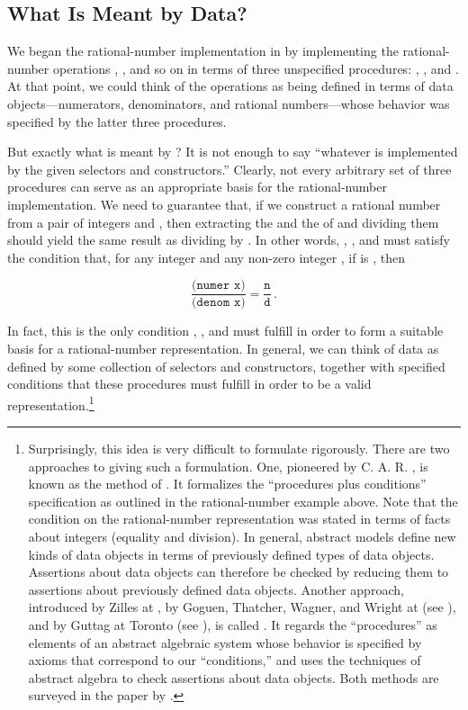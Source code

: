 \subsection{What Is Meant by Data?}
\label{Section 2.1.3}

We began the rational-number implementation in  by
implementing the rational-number operations , , and
so on in terms of three unspecified procedures: , ,
and .  At that point, we could think of the operations as being
defined in terms of data objects---numerators, denominators, and rational
numbers---whose behavior was specified by the latter three procedures.

But exactly what is meant by ?  It is not enough to say
``whatever is implemented by the given selectors and constructors.''  Clearly,
not every arbitrary set of three procedures can serve as an appropriate basis
for the rational-number implementation.  We need to guarantee that, if we
construct a rational number  from a pair of integers  and
, then extracting the  and the  of  and
dividing them should yield the same result as dividing  by .
In other words, , , and  must satisfy
the condition that, for any integer  and any non-zero integer ,
if  is , then

\[
\frac{\texttt{(numer x)}}{\texttt{(denom x)}}
=
\frac{\texttt{n}}{\texttt{d}}\,.
\]

In fact, this is the only condition , , and
 must fulfill in order to form a suitable basis for a
rational-number representation.  In general, we can think of data as defined by
some collection of selectors and constructors, together with specified
conditions that these procedures must fulfill in order to be a valid
representation.\footnote{Surprisingly, this idea is very difficult to formulate
rigorously. There are two approaches to giving such a formulation.  One,
pioneered by C. A. R. , is known as the method of .  It formalizes the ``procedures plus conditions'' specification as
outlined in the rational-number example above.  Note that the condition on the
rational-number representation was stated in terms of facts about integers
(equality and division).  In general, abstract models define new kinds of data
objects in terms of previously defined types of data objects.  Assertions about
data objects can therefore be checked by reducing them to assertions about
previously defined data objects.  Another approach, introduced by Zilles at
, by Goguen, Thatcher, Wagner, and Wright at 
(see ),
and by Guttag at Toronto (see ), is called
.  It regards the ``procedures'' as elements
of an abstract algebraic system whose behavior is specified by axioms that
correspond to our ``conditions,'' and uses the techniques of abstract algebra
to check assertions about data objects.  Both methods are surveyed in the paper
by .}

